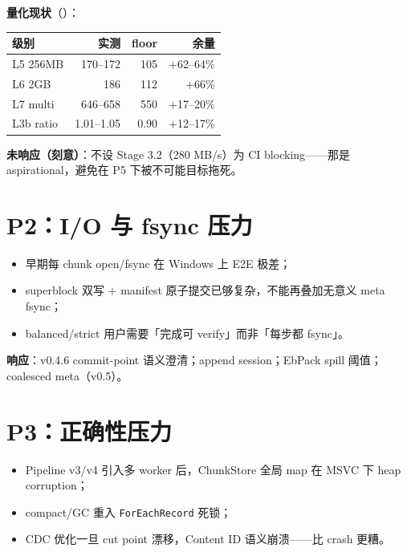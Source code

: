 \textbf{量化现状}（）：
\begin{table}[htbp]
\centering
\small
\begin{tabular}{@{}lrrr@{}}
\toprule
级别 & 实测 & floor & 余量 \\
\midrule
L5 256MB & 170--172 & 105 & +62--64\% \\
L6 2GB & 186 & 112 & +66\% \\
L7 multi & 646--658 & 550 & +17--20\% \\
L3b ratio & 1.01--1.05 & 0.90 & +12--17\% \\
\bottomrule
\end{tabular}
\end{table}

\textbf{未响应（刻意）}：不设 Stage 3.2（280 MB/s）为 CI blocking——那是 aspirational，避免在 P5 下被不可能目标拖死。

\section{P2：I/O 与 fsync 压力}

\begin{pressbox}[压力来源]
\begin{itemize}[nosep]
  \item 早期每 chunk open/fsync 在 Windows 上 E2E 极差；
  \item superblock 双写 + manifest 原子提交已够复杂，不能再叠加无意义 meta fsync；
  \item balanced/strict 用户需要「完成可 verify」而非「每步都 fsync」。
\end{itemize}
\end{pressbox}

\textbf{响应}：v0.4.6 commit-point 语义澄清；append session；EbPack spill 阈值；coalesced meta（v0.5）。

\section{P3：正确性压力}

\begin{pressbox}[压力来源]
\begin{itemize}[nosep]
  \item Pipeline v3/v4 引入多 worker 后，ChunkStore 全局 map 在 MSVC 下 heap corruption；
  \item compact/GC 重入 \texttt{ForEachRecord} 死锁；
  \item CDC 优化一旦 cut point 漂移，Content ID 语义崩溃——比 crash 更糟。
\end{itemize}
\end{pressbox}

